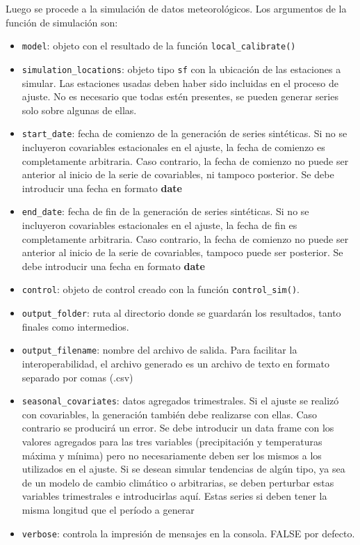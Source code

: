 \documentclass[
]{article}
\providecommand{\tightlist}{%
  \setlength{\itemsep}{0pt}\setlength{\parskip}{0pt}}
\begin{document}
Luego se procede a la simulación de datos meteorológicos. Los argumentos de la función de simulación son:

\begin{itemize}
\tightlist
\item
  \texttt{model}: objeto con el resultado de la función \texttt{local\_calibrate()}
\item
  \texttt{simulation\_locations}: objeto tipo \texttt{sf} con la ubicación de las estaciones a simular. Las estaciones usadas deben haber sido incluidas en el proceso de ajuste. No es necesario que todas estén presentes, se pueden generar series solo sobre algunas de ellas.
\item
  \texttt{start\_date}: fecha de comienzo de la generación de series sintéticas. Si no se incluyeron covariables estacionales en el ajuste, la fecha de comienzo es completamente arbitraria. Caso contrario, la fecha de comienzo no puede ser anterior al inicio de la serie de covariables, ni tampoco posterior. Se debe introducir una fecha en formato \textbf{date}
\item
  \texttt{end\_date}: fecha de fin de la generación de series sintéticas. Si no se incluyeron covariables estacionales en el ajuste, la fecha de fin es completamente arbitraria. Caso contrario, la fecha de comienzo no puede ser anterior al inicio de la serie de covariables, tampoco puede ser posterior. Se debe introducir una fecha en formato \textbf{date}
\item
  \texttt{control}: objeto de control creado con la función \texttt{control\_sim()}.
\item
  \texttt{output\_folder}: ruta al directorio donde se guardarán los resultados, tanto finales como intermedios.
\item
  \texttt{output\_filename}: nombre del archivo de salida. Para facilitar la interoperabilidad, el archivo generado es un archivo de texto en formato separado por comas (.csv)
\item
  \texttt{seasonal\_covariates}: datos agregados trimestrales. Si el ajuste se realizó con covariables, la generación también debe realizarse con ellas. Caso contrario se producirá un error. Se debe introducir un data frame con los valores agregados para las tres variables (precipitación y temperaturas máxima y mínima) pero no necesariamente deben ser los mismos a los utilizados en el ajuste. Si se desean simular tendencias de algún tipo, ya sea de un modelo de cambio climático o arbitrarias, se deben perturbar estas variables trimestrales e introducirlas aquí. Estas series si deben tener la misma longitud que el período a generar
\item
  \texttt{verbose}: controla la impresión de mensajes en la consola. FALSE por defecto.
\end{itemize}
\end{document}
